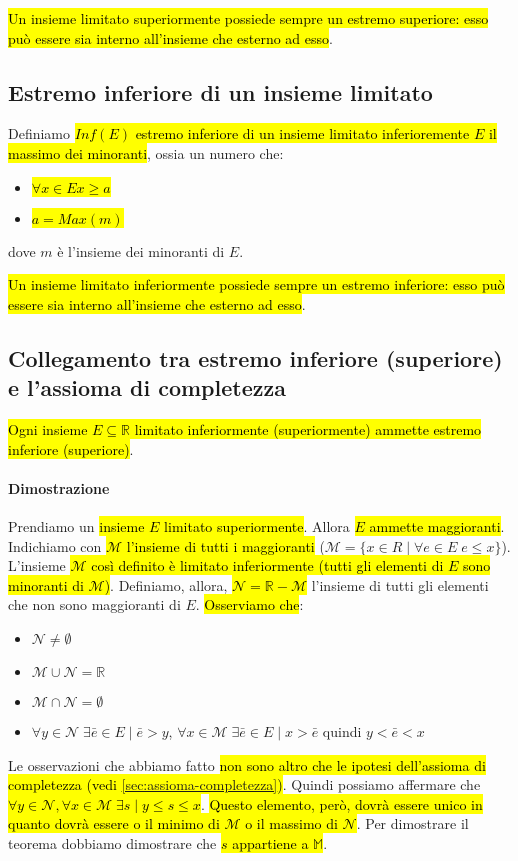 \hl{Un insieme limitato superiormente possiede sempre un estremo superiore: esso 
può essere sia interno all'insieme che esterno ad esso}.

\subsection{Estremo inferiore di un insieme limitato}
Definiamo \hl{$Inf(E)$ estremo inferiore di un insieme limitato inferioremente $E$
il massimo dei minoranti}, ossia un numero che:
\begin{itemize}
    \item \hl{$\forall x \in E x \geq a$}
    \item \hl{$a = Max(\mathit{m})$} 
\end{itemize}
dove $\mathit{m}$ è l'insieme dei minoranti di $E$.

\hl{Un insieme limitato inferiormente possiede sempre un estremo inferiore: esso 
può essere sia interno all'insieme che esterno ad esso}.

\subsection{Collegamento tra estremo inferiore (superiore) e l'assioma di completezza}
\hl{Ogni insieme $E \subseteq \mathbb{R}$ limitato inferiormente (superiormente)
ammette estremo inferiore (superiore)}.

\paragraph{Dimostrazione} Prendiamo un \hl{insieme $E$ limitato superiormente}. 
Allora \hl{$E$ ammette maggioranti}. Indichiamo con \hl{$\mathcal{M}$ l'insieme 
di tutti i maggioranti} ($\mathcal{M} = \{x \in R \mid \forall e \in E \; e \leq x\}$). 
L'insieme \hl{$\mathcal{M}$ così definito è limitato inferiormente (tutti gli 
elementi di $E$ sono minoranti di $\mathcal{M}$)}. Definiamo, allora, 
\hl{$\mathcal{N} = \mathbb{R} - \mathcal{M}$} l'insieme di tutti gli elementi 
che non sono maggioranti di $E$. \hl{Osserviamo che}: 
\begin{itemize}
    \item $\mathcal{N} \neq \emptyset$
    \item $\mathcal{M} \cup \mathcal{N} = \mathbb{R}$
    \item $\mathcal{M} \cap \mathcal{N} = \emptyset$
    \item $\forall y \in \mathcal{N} \; \exists \bar{e} \in E \mid \bar{e} > y$,  
        $\forall x \in \mathcal{M} \; \exists \bar{e} \in E \mid x > \bar{e}$ quindi 
        $y < \bar{e} < x$
\end{itemize}
Le osservazioni che abbiamo fatto \hl{non sono altro che le ipotesi dell'assioma
di completezza (vedi {\ref{sec:assioma-completezza}})}. Quindi possiamo affermare
che \hl{$\forall y \in\mathcal{N},\forall x \in\mathcal{M}\;\exists s \mid y \leq s \leq x$}.
\hl{Questo elemento, però, dovrà essere unico in quanto dovrà essere o il minimo di
$\mathcal{M}$ o il massimo di $\mathcal{N}$}. Per dimostrare il teorema dobbiamo 
dimostrare che \hl{$s$ appartiene a $\mathbb{M}$}.

